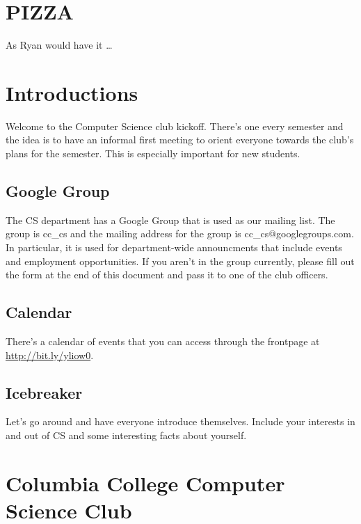 

\renewcommand\TITLE{CCCS: Spring 2016 Agenda}


\topmatter


\section{PIZZA}
\label{sec-1}

As Ryan would have it \ldots{}


\newpage


\section{Introductions}
\label{sec-2}

Welcome to the Computer Science club kickoff. There's one every semester
and the idea is to have an informal first meeting to orient everyone towards
the club's plans for the semester. This is especially important for new
students.

\subsection{Google Group}
\label{sec-2-1}

The CS department has a Google Group that is used as our mailing list. The
group is cc\_cs and the mailing address for the group is cc\_cs@googlegroups.com.
In particular, it is used for department-wide announcments that include events
and employment opportunities. If you aren't in the group currently, please fill
out the form at the end of this document and pass it to one of the club officers.

\subsection{Calendar}
\label{sec-2-2}

There's a calendar of events that you can access through the frontpage at
\url{http://bit.ly/yliow0}.

\subsection{Icebreaker}
\label{sec-2-3}

Let's go around and have everyone introduce themselves. Include your interests
in and out of CS and some interesting facts about yourself.


\newpage


\section{Columbia College Computer Science Club}
\label{sec-3}

